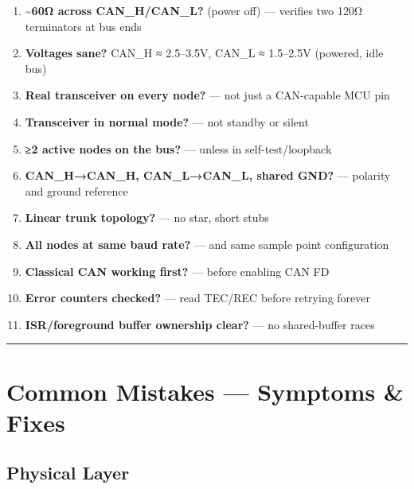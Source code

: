 \documentclass[12pt,a4paper,oneside]{report}
\providecommand{\tightlist}{\setlength{\itemsep}{0pt}\setlength{\parskip}{0pt}}
\begin{document}
\begin{enumerate}
\def\labelenumi{\arabic{enumi}.}
\tightlist
\item
  \textbf{\textasciitilde60Ω across CAN\_H/CAN\_L?} (power off) --- verifies two
  120Ω terminators at bus ends
\item
  \textbf{Voltages sane?} CAN\_H ≈ 2.5--3.5V, CAN\_L ≈ 1.5--2.5V (powered, idle
  bus)
\item
  \textbf{Real transceiver on every node?} --- not just a CAN-capable MCU pin
\item
  \textbf{Transceiver in normal mode?} --- not standby or silent
\item
  \textbf{≥2 active nodes on the bus?} --- unless in self-test/loopback
\item
  \textbf{CAN\_H→CAN\_H, CAN\_L→CAN\_L, shared GND?} --- polarity and ground
  reference
\item
  \textbf{Linear trunk topology?} --- no star, short stubs
\item
  \textbf{All nodes at same baud rate?} --- and same sample point configuration
\item
  \textbf{Classical CAN working first?} --- before enabling CAN FD
\item
  \textbf{Error counters checked?} --- read TEC/REC before retrying forever
\item
  \textbf{ISR/foreground buffer ownership clear?} --- no shared-buffer races
\end{enumerate}

\begin{center}\rule{0.5\linewidth}{0.5pt}\end{center}

\section{Common Mistakes --- Symptoms \&
Fixes}\label{common-mistakes-symptoms-fixes}

\subsection{Physical Layer}\label{physical-layer}
\end{document}
